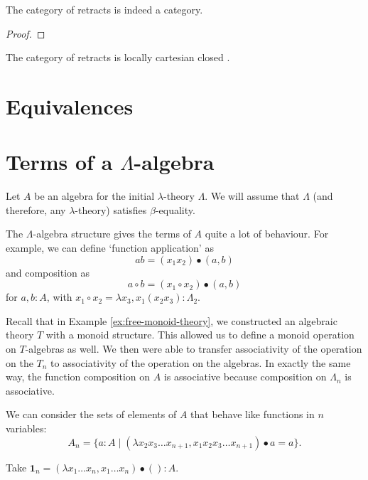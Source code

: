 \begin{lemma}
  The category of retracts is indeed a category.
\end{lemma}
\begin{proof}
  \TODO
\end{proof}

\begin{theorem}
  The category of retracts is locally cartesian closed \TODO.
\end{theorem}


\section{Equivalences}


\section{Terms of a \texorpdfstring{$ \Lambda $}{Lambda}-algebra}
Let $ A $ be an algebra for the initial $ \lambda $-theory $ \Lambda $. We will assume that $ \Lambda $ (and therefore, any $ \lambda $-theory) satisfies $ \beta $-equality.

The $ \Lambda $-algebra structure gives the terms of $ A $ quite a lot of behaviour. For example, we can define `function application' as
\[ a b = (x_1 x_2) \bullet (a, b) \]
and composition as
\[ a \circ b = (x_1 \circ x_2) \bullet (a, b) \]
for $ a, b : A $, with $ x_1 \circ x_2 = \lambda x_3, x_1 (x_2 x_3) : \Lambda_2 $.

\begin{remark}
  Recall that in Example \ref{ex:free-monoid-theory}, we constructed an algebraic theory $ T $ with a monoid structure. This allowed us to define a monoid operation on $ T $-algebras as well. We then were able to transfer associativity of the operation on the $ T_n $ to associativity of the operation on the algebras. In exactly the same way, the function composition on $ A $ is associative because composition on $ \Lambda_n $ is associative.
\end{remark}

\begin{definition}
  We can consider the sets of elements of $ A $ that behave like functions in $ n $ variables:
  \[ A_n = \{ a : A \mid (\lambda x_2 x_3 \dots x_{n + 1}, x_1 x_2 x_3 \dots x_{n + 1}) \bullet a = a \}. \]
\end{definition}

\begin{definition}
  Take $ \mathbf 1_n = (\lambda x_1 \dots x_n, x_1 \dots x_n) \bullet () : A $.
\end{definition}

